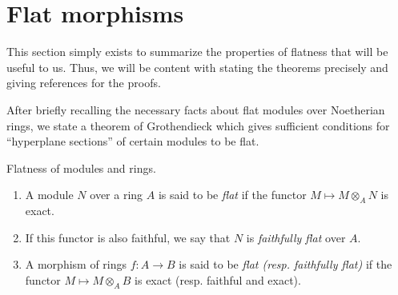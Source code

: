 \section{Flat morphisms}
\label{section-flat-morphisms}

\noindent
This section simply exists to summarize the properties of flatness that will
be useful to us. Thus, we will be content with stating the theorems precisely
and giving references for the proofs.

\medskip\noindent
After briefly recalling the necessary facts about flat modules over Noetherian
rings, we state a theorem of Grothendieck which gives sufficient conditions
for ``hyperplane sections'' of certain modules to be flat.

\begin{definition}
\label{definition-flat-rings}
Flatness of modules and rings.
\begin{enumerate}
\item A module $N$ over a ring $A$ is said to be {\it flat}
if the functor $M \mapsto M \otimes_A N$ is exact.
\item If this functor is also faithful, we say that
$N$ is {\it faithfully flat} over $A$.
\item A morphism of rings $f : A \to B$ is said to be
{\it flat (resp. faithfully flat)}
if the functor $M \mapsto M \otimes_A B$ is exact
(resp. faithful and exact).
\end{enumerate}
\end{definition}

